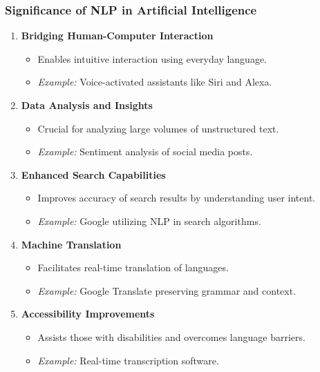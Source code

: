 \documentclass[aspectratio=169]{beamer}
\begin{document}
\begin{frame}[fragile]
    \frametitle{Significance of NLP in Artificial Intelligence}
    
    \begin{enumerate}
        \item \textbf{Bridging Human-Computer Interaction}
        \begin{itemize}
            \item Enables intuitive interaction using everyday language.
            \item \textit{Example:} Voice-activated assistants like Siri and Alexa.
        \end{itemize}
        
        \item \textbf{Data Analysis and Insights}
        \begin{itemize}
            \item Crucial for analyzing large volumes of unstructured text.
            \item \textit{Example:} Sentiment analysis of social media posts.
        \end{itemize}

        \item \textbf{Enhanced Search Capabilities}
        \begin{itemize}
            \item Improves accuracy of search results by understanding user intent.
            \item \textit{Example:} Google utilizing NLP in search algorithms.
        \end{itemize}

        \item \textbf{Machine Translation}
        \begin{itemize}
            \item Facilitates real-time translation of languages.
            \item \textit{Example:} Google Translate preserving grammar and context.
        \end{itemize}

        \item \textbf{Accessibility Improvements}
        \begin{itemize}
            \item Assists those with disabilities and overcomes language barriers.
            \item \textit{Example:} Real-time transcription software.
        \end{itemize}
    \end{enumerate}
\end{frame}
\end{document}
